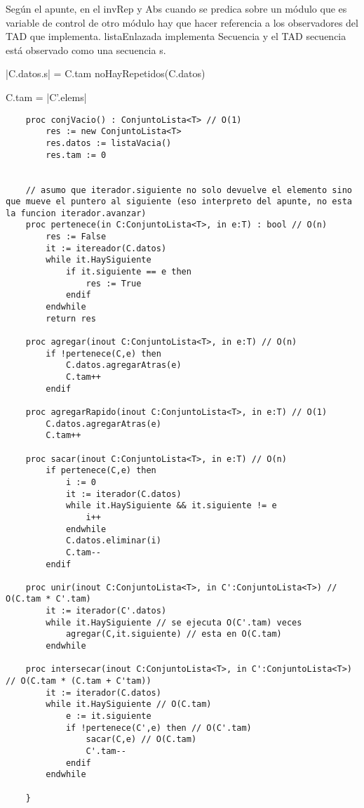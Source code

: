 \documentclass[10pt,a4paper]{article}
\begin{document}
Según el apunte, en el invRep y Abs cuando se predica sobre un módulo que es variable de control de otro módulo 
hay que hacer referencia a los observadores del TAD que implementa. listaEnlazada implementa Secuencia y el TAD secuencia 
está observado como una secuencia s.

{|C.datos.s| = C.tam \land noHayRepetidos(C.datos)}

{}

{C.tam = |C'.elems| \land \\ 
}

\begin{lstlisting}
	proc conjVacio() : ConjuntoLista<T> // O(1)
		res := new ConjuntoLista<T>
		res.datos := listaVacia()
		res.tam := 0


	// asumo que iterador.siguiente no solo devuelve el elemento sino que mueve el puntero al siguiente (eso interpreto del apunte, no esta la funcion iterador.avanzar)
	proc pertenece(in C:ConjuntoLista<T>, in e:T) : bool // O(n)
		res := False
		it := itereador(C.datos) 
		while it.HaySiguiente
			if it.siguiente == e then 
				res := True
			endif
		endwhile
		return res

	proc agregar(inout C:ConjuntoLista<T>, in e:T) // O(n)
		if !pertenece(C,e) then
			C.datos.agregarAtras(e)
			C.tam++
		endif

	proc agregarRapido(inout C:ConjuntoLista<T>, in e:T) // O(1)
		C.datos.agregarAtras(e)
		C.tam++

	proc sacar(inout C:ConjuntoLista<T>, in e:T) // O(n)
		if pertenece(C,e) then
			i := 0 
			it := iterador(C.datos)
			while it.HaySiguiente && it.siguiente != e
				i++
			endwhile
			C.datos.eliminar(i)
			C.tam--
		endif

	proc unir(inout C:ConjuntoLista<T>, in C':ConjuntoLista<T>) // O(C.tam * C'.tam)
		it := iterador(C'.datos)
		while it.HaySiguiente // se ejecuta O(C'.tam) veces
			agregar(C,it.siguiente) // esta en O(C.tam)
		endwhile

	proc intersecar(inout C:ConjuntoLista<T>, in C':ConjuntoLista<T>) // O(C.tam * (C.tam + C'tam))
		it := iterador(C.datos)
		while it.HaySiguiente // O(C.tam)
			e := it.siguiente
			if !pertenece(C',e) then // O(C'.tam)
				sacar(C,e) // O(C.tam)
				C'.tam--
			endif
		endwhile

	}
\end{lstlisting}
\end{document}
